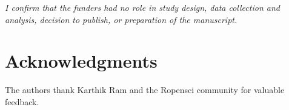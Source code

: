\documentclass[9pt,a4paper,]{extarticle}
\begin{document}
\emph{I confirm that the funders had no role in study design, data collection and
analysis, decision to publish, or preparation of the manuscript.}

\hypertarget{acknowledgments}{%
\section{Acknowledgments}\label{acknowledgments}}

The authors thank Karthik Ram and the Ropensci community for valuable
feedback.

\renewcommand\refname{References}
{\small}
\end{document}
